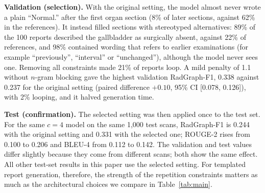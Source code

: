 \documentclass[conference]{IEEEtran}
\begin{document}
\textbf{Validation (selection).} With the original setting, the model almost
never wrote a plain ``Normal.'' after the first organ section (8\% of later
sections, against 62\% in the references). It instead filled sections with
stereotyped alternatives: 89\% of the 100 reports described the gallbladder as
surgically absent, against 22\% of references, and 98\% contained wording
that refers to earlier examinations (for example ``previously'', ``interval''
or ``unchanged''), although the model never sees one. Removing all
constraints made 21\% of reports loop. A mild penalty of 1.1 without $n$-gram
blocking gave the highest validation RadGraph-F1, 0.338 against 0.237 for the
original setting (paired difference $+0.10$, 95\% CI [0.078, 0.126]), with
2\% looping, and it halved generation time.

\textbf{Test (confirmation).} The selected setting was then applied once to
the test set. For the same $c=4$ model on the same 1,000 test scans,
RadGraph-F1 is 0.244 with the original setting and 0.331 with the selected
one; ROUGE-2 rises from 0.100 to 0.206 and BLEU-4 from 0.112 to 0.142. The
validation and test values differ slightly because they come from different
scans; both show the same effect. All other test-set results in this paper
use the selected setting. For templated report generation, therefore, the
strength of the repetition constraints matters as much as the architectural
choices we compare in Table~\ref{tab:main}.
\end{document}
